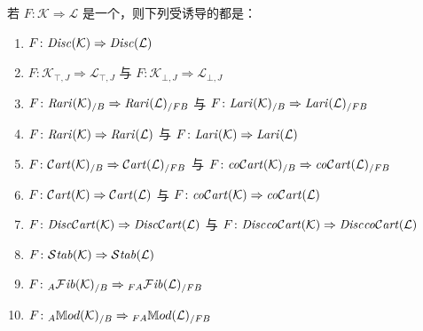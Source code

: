 \begin{corollary}\label{cor:induced-biequivalences}
若 $F\colon\mathcal{K}\Rightarrow\mathcal{L}$ 是一个\trCosmologicalBiequivalence，则下列受诱导的\trCosmologicalFunctor{}都是\trBiequivalence：
\begin{enumerate}[label=(\roman*)]
\item $F\colon\mathit{Disc}(\mathcal{K})\Rightarrow\mathit{Disc}(\mathcal{L})$
\item $F\colon\mathcal{K}_{\top,J}\Rightarrow\mathcal{L}_{\top,J}$
  与 $F\colon\mathcal{K}_{\bot,J}\Rightarrow\mathcal{L}_{\bot,J}$
\item $F\colon\mathit{Rari}(\mathcal{K})_{/B}\Rightarrow\mathit{Rari}(\mathcal{L})_{/FB}$
  与 $F\colon\mathit{Lari}(\mathcal{K})_{/B}\Rightarrow\mathit{Lari}(\mathcal{L})_{/FB}$
\item $F\colon\mathit{Rari}(\mathcal{K})\Rightarrow\mathit{Rari}(\mathcal{L})$
  与 $F\colon\mathit{Lari}(\mathcal{K})\Rightarrow\mathit{Lari}(\mathcal{L})$
\item $F\colon\mathcal{C}\mathit{art}(\mathcal{K})_{/B}\Rightarrow\mathcal{C}\mathit{art}(\mathcal{L})_{/FB}$
  与 $F\colon\mathit{co}\mathcal{C}\mathit{art}(\mathcal{K})_{/B}\Rightarrow\mathit{co}\mathcal{C}\mathit{art}(\mathcal{L})_{/FB}$
\item $F\colon\mathcal{C}\mathit{art}(\mathcal{K})\Rightarrow\mathcal{C}\mathit{art}(\mathcal{L})$
  与 $F\colon\mathit{co}\mathcal{C}\mathit{art}(\mathcal{K})\Rightarrow\mathit{co}\mathcal{C}\mathit{art}(\mathcal{L})$
\item $F\colon\mathit{Disc}\mathcal{C}\mathit{art}(\mathcal{K})\Rightarrow\mathit{Disc}\mathcal{C}\mathit{art}(\mathcal{L})$
  与 $F\colon\mathit{Disc}\mathit{co}\mathcal{C}\mathit{art}(\mathcal{K})\Rightarrow\mathit{Disc}\mathit{co}\mathcal{C}\mathit{art}(\mathcal{L})$
\item $F\colon\mathcal{S}\mathit{tab}(\mathcal{K})\Rightarrow\mathcal{S}\mathit{tab}(\mathcal{L})$
\item $F\colon{}_{A}\mathcal{F}\mathit{ib}(\mathcal{K})_{/B}\Rightarrow{}_{FA}\mathcal{F}\mathit{ib}(\mathcal{L})_{/FB}$
\item $F\colon{}_{A}\mathbb{M}od(\mathcal{K})_{/B}\Rightarrow{}_{FA}\mathbb{M}od(\mathcal{L})_{/FB}$
\end{enumerate}
\end{corollary}

